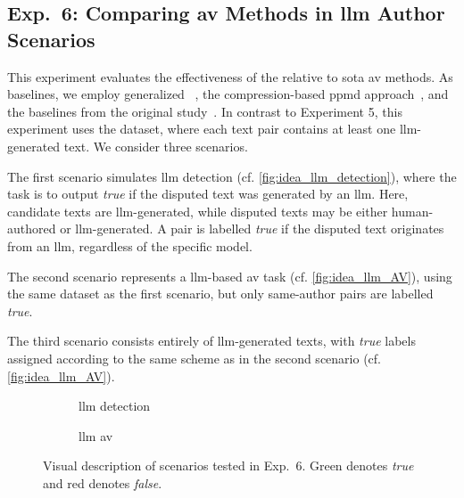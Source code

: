 \subsection{Exp.\ 6: Comparing \acs{av} Methods in \acs{llm} Author Scenarios}

This experiment evaluates the effectiveness of the \impAppr{} relative to \acl{sota} \ac{av} methods. 
As baselines, we employ generalized \unmasking{}~\citep{bevendorff_generalizing_2019}, the compression-based \ac{ppmd} approach~\citep{stamatatos_survey_2009}, and the baselines from the original \impAppr{} study~\citep{koppel_determining_2014}. 
In contrast to Experiment 5, this experiment uses the \dataArtificialStudent{} dataset, where each text pair contains at least one \ac{llm}-generated text. 
We consider three scenarios. 

The first scenario simulates \ac{llm} detection (cf. \autoref{fig:idea_llm_detection}), where the task is to output \textit{true} if the disputed text was generated by an \ac{llm}. 
Here, candidate texts are \ac{llm}-generated, while disputed texts may be either human-authored or \ac{llm}-generated. 
A pair is labelled \textit{true} if the disputed text originates from an \ac{llm}, regardless of the specific model. 

The second scenario represents a \ac{llm}-based \ac{av} task (cf. \autoref{fig:idea_llm_AV}), using the same dataset as the first scenario, but only same-author pairs are labelled \textit{true}. 

The third scenario consists entirely of \ac{llm}-generated texts, with \textit{true} labels assigned according to the same scheme as in the second scenario (cf. \autoref{fig:idea_llm_AV}). 

\begin{figure}[htbp]
  \centering
  \begin{subfigure}{0.45\textwidth}
    \centering
    
    \caption{\ac{llm} detection}
    \label{fig:idea_llm_detection}
  \end{subfigure}
  \hfill
  \begin{subfigure}{0.45\textwidth}
    \centering
    
    \caption{\ac{llm} \ac{av}}
    \label{fig:idea_llm_AV}
  \end{subfigure}
  \caption[Scenarios tested in Exp.\ 6.]{Visual description of scenarios tested in Exp.\ 6.
  Green denotes \textit{true} and red denotes \textit{false}.
  }
  \label{fig:ideas_exp6}
\end{figure}

